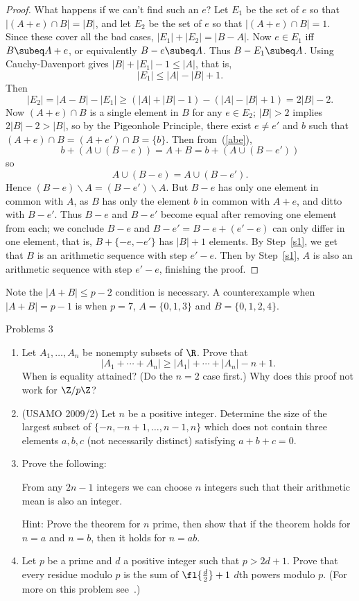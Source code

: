 \begin{proof}
What happens if we can't find such an $e$? Let $E_1$ be the set of $e$ so that $|(A+e)\cap B|=|B|$, and let $E_2$ be the set of $e$ so that $|(A+e)\cap B|=1$. Since these cover all the bad cases, $|E_1|+|E_2|=|B-A|$. 
Now $e\in E_1$ iff $B\subeq A+e$, or equivalently $B-e\subeq A$. Thus $B-E_1\subeq A$. Using Cauchy-Davenport gives $|B|+|E_1|-1\leq |A|$, that is, \[|E_1|\leq |A|-|B|+1.\]
Then
\[|E_2|=|A-B|-|E_1|\geq (|A|+|B|-1)-(|A|-|B|+1)=2|B|-2.\]
Now $(A+e)\cap B$ is a single element in $B$ for any $e\in E_2$; $|B|>2$ implies $2|B|-2>|B|$, so by the Pigeonhole Principle, there exist $e\neq  e'$ and $b$ such that $(A+e)\cap B=(A+e')\cap B=\{b\}$. Then from~(\ref{abe}), 
\[b+(A\cup (B-e))=A+B=b+(A\cup (B-e'))\]
so
\[
A\cup (B-e)=A\cup (B-e').
\]
Hence $(B-e)\backslash A=(B-e')\backslash A$. 
But $B-e$ has only one element in common with $A$, as $B$ has only the element $b$ in common with $A+e$, and ditto with $B-e'$. Thus $B-e$ and $B-e'$ become equal after removing one element from each; we conclude $B-e$ and $B-e'=B-e+(e'-e)$ can only differ in one element, that is, $B+\{-e,-e'\}$ has $|B|+1$ elements. By Step~\ref{s1}, we get that $B$ is an arithmetic sequence with step $e'-e$. Then by Step~\ref{s1}, $A$ is also an arithmetic sequence with step $e'-e$, finishing the proof.
\end{proof}
\begin{rem}
Note the $|A+B|\leq p-2$ condition is necessary. A counterexample when $|A+B|=p-1$ is when $p=7$, $A=\{0,1,3\}$ and $B=\{0,1,2,4\}$.
\end{rem}
{\Large Problems 3}
\begin{enumerate}
\item Let $A_1,\ldots, A_n$ be nonempty subsets of $\R$. Prove that
\[
|A_1+\cdots +A_n|\geq |A_1|+\cdots +|A_n|-n+1.
\]
When is equality attained? (Do the $n=2$ case first.)
Why does this proof not work for $\Z/p\Z$?
\item
(USAMO 2009/2) Let $n$ be a positive integer. Determine the size of the largest subset of $\{-n,-n+1,\ldots, n-1,n\}$ which does not contain three elements $a,b,c$ (not necessarily distinct) satisfying $a+b+c=0$.
\item Prove the following:
\begin{thm}\label{erdos-ginzburg-ziv}
From any $2n-1$ integers we can choose $n$ integers such that their arithmetic mean is also an integer.
\end{thm}
Hint: Prove the theorem for $n$ prime, then show that if the theorem holds for $n=a$ and $n=b$, then it holds for $n=ab$. 
\item Let $p$ be a prime and $d$ a positive integer such that $p>2d+1$. Prove that every residue modulo $p$ is the sum of $\fl{\frac d2}+1$ $d$th powers modulo $p$. (For more on this problem see~\cite{Lee}.)
\end{enumerate}
